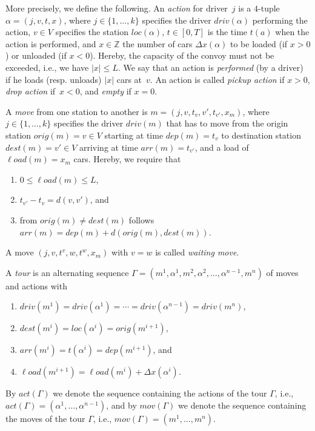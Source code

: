 \documentclass[english]{llncs}
\numberwithin{sublemma}{lemma}
\newcommand{\locations}{\ensuremath{V}}
\newcommand{\aloc}{\ensuremath{loc}}
\newcommand{\acnum}{\ensuremath{\Delta x}}
\newcommand{\loadd}{\ensuremath{x_m}}
\newcommand{\driver}{\ensuremath{driv}}
\newcommand{\ndriver}{\ensuremath{k}}
\newcommand{\orig}{\ensuremath{orig}}
\newcommand{\origin}{\ensuremath{orig}}
\newcommand{\dest}{\ensuremath{dest}}
\newcommand{\tdep}{\ensuremath{dep}}
\newcommand{\tarr}{\ensuremath{arr}}
\newcommand{\mloadd}{\ensuremath{\ell oad}}
\newcommand{\ntourd}{\ensuremath{n}}
\newcommand{\abs}[1]{\ensuremath{\lvert #1 \rvert}}
\newcommand{\ZZ}{\ensuremath{\mathbb{Z}}}
\newcommand{\capd}{\ensuremath{L}}
\newcommand{\tourd}{\ensuremath{\Gamma}}
\newcommand{\action}{\ensuremath{\alpha}}
\newcommand{\move}{\ensuremath{m}}
\newcommand{\dist}{\ensuremath{d}}
\newcommand{\tact}{\ensuremath{act}}
\newcommand{\tmov}{\ensuremath{mov}}
\begin{document}
More precisely, we define the following.
An \emph{action} for driver~$j$ is a $4$-tuple $\action = (j, v, t, x)$, where 
$j \in \{ 1, \dotsc, \ndriver \}$ specifies the driver $\driver(\action)$ performing the action, 
$v \in \locations$ specifies the station $\aloc(\action)$, 
$t \in [0, T ]$ is the time $t(a)$ when the action is performed, 
and $x \in \ZZ$ the number of cars $\acnum(\action)$ to be loaded (if $x > 0$) or unloaded (if $x < 0$). 
Hereby, the capacity of the convoy must not be exceeded, i.e., we have $\abs{x} \leq \capd$.
We say that an action is \emph{performed} (by a driver) if he loads (resp. unloads) $\abs{x}$ cars at~$v$.
An action is called \emph{pickup action} if $x > 0$, \emph{drop action} if~$x < 0$, and \emph{empty} if $x = 0$.


A \emph{move} from one station to another is
$\move = (j, v, t_v, v', t_{v'}, \loadd)$, where
$j \in \{ 1, \dotsc, \ndriver \}$ specifies the driver $\driver(\move)$ that has to move from the origin station $\origin(\move) = v \in \locations$ starting at time $\tdep(\move) = t_v$
to destination station $\dest(\move) = v' \in \locations$ arriving at time $\tarr(\move) = t_{v'}$, and a load of $\mloadd(\move) = \loadd$ cars.
Hereby, we require that 
\begin{enumerate}
 \item\label{def: enum: move: 0} $0 \leq \mloadd(\move) \leq \capd$,
\item\label{def: enum: move: 1} $t_{v'} - t_v = d(v, v')$, and
 \item\label{def: enum: move: 2} from $\orig(\move) \neq \dest(\move)$ follows $\tarr(\move) = \tdep(\move) + \dist(\orig(\move), \dest(\move))$.
\end{enumerate}
A move $(j, v, t^v, w, t^w, \loadd)$ with $v = w$ is called \emph{waiting move}.



A \emph{tour} is an alternating sequence $\tourd = (\move^1, \action^1, \move^2, \action^2, \dotsc, \action^{\ntourd - 1}, \move^\ntourd)$ of moves and actions with
\begin{enumerate}
 \item\label{def: enum: tour: 1} $
\driver(\move^1) = \driver(\action^1) = \dotsm = \driver(\action^{\ntourd - 1}) = \driver(\move^\ntourd)$, 
 \item\label{def: enum: tour: 2} $\dest(\move^i) = \aloc(\action^i) = \orig(\move^{i+1})$,
 \item\label{def: enum: tour: 3} $\tarr(\move^i) = t(\action^i) = \tdep(\move^{i+1})$, and
 \item\label{def: enum: tour: 5} $\mloadd(\move^{i+1}) = \mloadd(\move^{i}) + \acnum(\action^i)$.
\end{enumerate}
By $\tact(\tourd)$ we denote the sequence containing the actions of the tour $\tourd$, i.e., $\tact(\tourd) = (\action^1, \dotsc, \action^{\ntourd-1})$,
and by $\tmov(\tourd)$ we denote the sequence containing the moves of the tour $\tourd$, i.e., $\tmov(\tourd) = (\move^1, \dotsc, \move^\ntourd)$.
\end{document}
